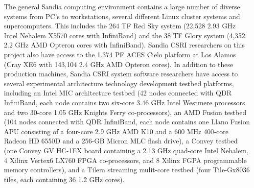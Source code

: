 The general Sandia computing environment contains a large number of diverse systems from PC’s to workstations, several different Linux cluster systems and supercomputers. This includes the 264 TF Red Sky system (22,528 2.93 GHz Intel Nehalem X5570 cores with InfiniBand) and the 38 TF Glory system (4,352 2.2 GHz AMD Opteron cores with InfiniBand). Sandia CSRI researchers on this project also have access to the 1.374 PF ACES Cielo platform at Los Alamos (Cray XE6 with 143,104 2.4 GHz AMD Opteron cores).
In addition to these production machines, Sandia CSRI system software researchers have access to several experimental architecture technology development testbed platforms, including an Intel MIC architecture testbed (42 nodes connected with QDR InfiniBand, each node contains two six-core 3.46 GHz Intel Westmere processors and two 30-core 1.05 GHz Knights Ferry co-processors), an AMD Fusion testbed (104 nodes connected with QDR InfiniBand, each node contains one Llano Fusion APU consisting of a four-core 2.9 GHz AMD K10 and a 600 MHz 400-core Radeon HD 6550D and a 256-GB Micron MLC flash drive), a Convey testbed (one Convey GV HC-1EX board containing a 2.13 GHz quad-core Intel Nehalem, 4 Xilinx Vertex6 LX760 FPGA co-processors, and 8 Xilinx FGPA programmable memory controllers), and a Tilera streaming mulit-core testbed (four Tile-Gx8036 tiles, each containing 36 1.2 GHz cores).

